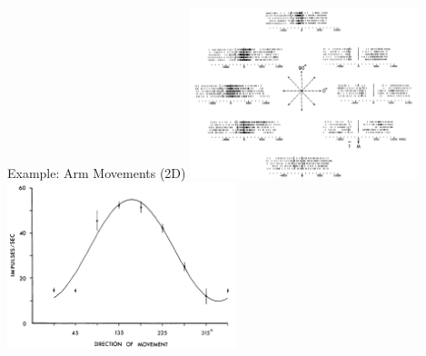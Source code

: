 \documentclass[handout,aspectratio=169]{beamer}
\begin{document}
\begin{frame}{Example: Arm Movements (2D)}
	\centering
	\includegraphics[width=0.5\textwidth]{media/georgopoulos_spike_raster.png}%
	\includegraphics[width=0.5\textwidth]{media/georgopoulos_tuning.png}
\end{frame}
\end{document}

